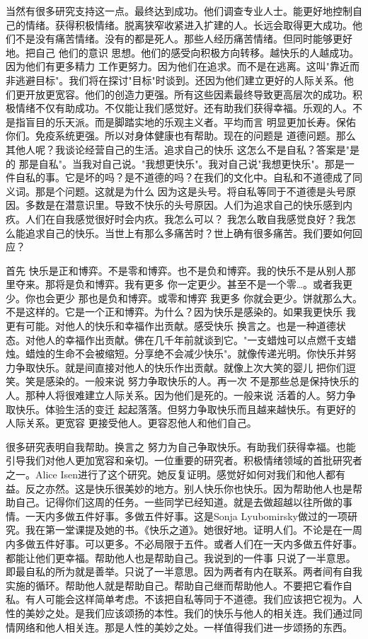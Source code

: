 当然有很多研究支持这一点。最终达到成功。他们调查专业人士。能更好地控制自己的情绪。获得积极情绪。脱离狭窄收紧进入扩建的人。长远会取得更大成功。他们不是没有痛苦情绪。没有的都是死人。那些人经历痛苦情绪。但同时能够更好地。把自己 他们的意识 思想。他们的感受向积极方向转移。越快乐的人越成功。因为他们有更多精力 工作更努力。因为他们在追求。而不是在逃离。这叫"靠近而非逃避目标"。我们将在探讨"目标"时谈到。还因为他们建立更好的人际关系。他们更开放更宽容。他们的创造力更强。所有这些因素最终导致更高层次的成功。积极情绪不仅有助成功。不仅能让我们感觉好。还有助我们获得幸福。乐观的人。不是指盲目的乐天派。而是脚踏实地的乐观主义者。平均而言 明显更加长寿。保佑你们。免疫系统更强。所以对身体健康也有帮助。现在的问题是 道德问题。那么其他人呢？我谈论经营自己的生活。追求自己的快乐 这怎么不是自私？答案是"是的 那是自私"。当我对自己说。"我想更快乐"。我对自己说"我想更快乐"。那是一件自私的事。它是坏的吗？是不道德的吗？在我们的文化中。自私和不道德成了同义词。那是个问题。这就是为什么 因为这是头号。将自私等同于不道德是头号原因。多数是在潜意识里。导致不快乐的头号原因。人们为追求自己的快乐感到内疚。人们在自我感觉很好时会内疚。我怎么可以？ 我怎么敢自我感觉良好？我怎么能追求自己的快乐。当世上有那么多痛苦时？世上确有很多痛苦。我们要如何回应？ 

首先 快乐是正和博弈。不是零和博弈。也不是负和博弈。我的快乐不是从别人那里夺来。那将是负和博弈。我有更多 你一定更少。甚至不是一个零…。或者我更少。你也会更少 那也是负和博弈。或零和博弈 我更多 你就会更少。饼就那么大。不是这样的。它是一个正和博弈。为什么？因为快乐是感染的。如果我更快乐 我更有可能。对他人的快乐和幸福作出贡献。感受快乐 换言之。也是一种道德状态。对他人的幸福作出贡献。佛在几千年前就谈到它。"一支蜡烛可以点燃千支蜡烛。蜡烛的生命不会被缩短。分享绝不会减少快乐"。就像传递光明。你快乐并努力争取快乐。就是间直接对他人的快乐作出贡献。就像上次大笑的婴儿 把你们逗笑。笑是感染的。一般来说 努力争取快乐的人。再一次 不是那些总是保持快乐的人。那种人将很难建立人际关系。因为他们是死的。一般来说 活着的人。努力争取快乐。体验生活的变迁 起起落落。但努力争取快乐而且越来越快乐。有更好的人际关系。更宽容 更接受他人。更容忍他人和他们自己。 

很多研究表明自我帮助。换言之 努力为自己争取快乐。有助我们获得幸福。也能引导我们对他人更加宽容和亲切。一位重要的研究者。积极情绪领域的首批研究者之一。Alice Isen进行了这个研究。她反复证明。感觉好如何对我们和他人都有益。反之亦然。这是快乐很美妙的地方。别人快乐你也快乐。因为帮助他人也是帮助自己。记得你们这周的任务。一些同学已经知道。就是去做超越以往所做的事情。一天内多做五件好事。多做五件好事。这是Sonja Lyubomirsky做过的一项研究。我在第一堂课提及她的书。《快乐之道》。她很好地。证明人们。不论是在一周内多做五件好事。可以更多。不必局限于五件。或者人们在一天内多做五件好事。都能让他们更幸福。帮助他人也是帮助自己。我说到的一件事 只说了一半意思。即最自私的所为就是善举。只说了一半意思。因为两者有内在联系。两者间有自我实施的循环。帮助他人就是帮助自己。帮助自己继而帮助他人。不要把它看作自私。有人可能会这样简单考虑。不该把自私等同于不道德。我们应该把它视为。人性的美妙之处。是我们应该颂扬的本性。我们的快乐与他人的相关连。我们通过同情网络和他人相关连。那是人性的美妙之处。一样值得我们进一步颂扬的东西。 

